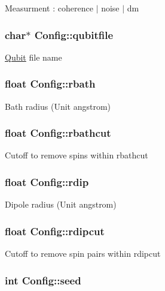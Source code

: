 Measurment \-: coherence $|$ noise $|$ dm \hypertarget{structConfig_a9f5ed3dfb6ae52627a94099cb837cfbf}{
\subsubsection[{qubitfile}]{\setlength{\rightskip}{0pt plus 5cm}char$\ast$ Config\-::qubitfile}}\label{structConfig_a9f5ed3dfb6ae52627a94099cb837cfbf}
\hyperlink{structQubit}{Qubit} file name \hypertarget{structConfig_a79389333cffeb4063cf1d39e89234c57}{
\subsubsection[{rbath}]{\setlength{\rightskip}{0pt plus 5cm}float Config\-::rbath}}\label{structConfig_a79389333cffeb4063cf1d39e89234c57}
Bath radius (Unit angstrom) \hypertarget{structConfig_a2eeef76fa44792c24c3320ff6b4d19c8}{
\subsubsection[{rbathcut}]{\setlength{\rightskip}{0pt plus 5cm}float Config\-::rbathcut}}\label{structConfig_a2eeef76fa44792c24c3320ff6b4d19c8}
Cutoff to remove spins within rbathcut \hypertarget{structConfig_af9d5e3a3b185555cbe04ad12733612b1}{
\subsubsection[{rdip}]{\setlength{\rightskip}{0pt plus 5cm}float Config\-::rdip}}\label{structConfig_af9d5e3a3b185555cbe04ad12733612b1}
Dipole radius (Unit angstrom) \hypertarget{structConfig_a39b6cf20220772b2326ddf423bf3a3f7}{
\subsubsection[{rdipcut}]{\setlength{\rightskip}{0pt plus 5cm}float Config\-::rdipcut}}\label{structConfig_a39b6cf20220772b2326ddf423bf3a3f7}
Cutoff to remove spin pairs within rdipcut \hypertarget{structConfig_a92ed038fd7676ed62640f59270a60545}{
\subsubsection[{seed}]{\setlength{\rightskip}{0pt plus 5cm}int Config\-::seed}}\label{structConfig_a92ed038fd7676ed62640f59270a60545}
